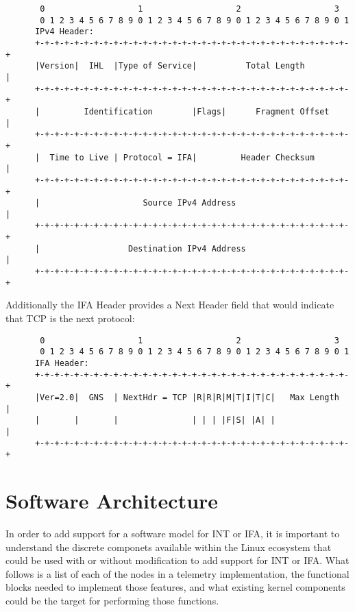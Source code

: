 \documentclass[letterpaper,twocolumn,10pt]{article}
\begin{document}
\tiny
\begin{center}
\begin{verbatim}
       0                   1                   2                   3
       0 1 2 3 4 5 6 7 8 9 0 1 2 3 4 5 6 7 8 9 0 1 2 3 4 5 6 7 8 9 0 1
      IPv4 Header:
      +-+-+-+-+-+-+-+-+-+-+-+-+-+-+-+-+-+-+-+-+-+-+-+-+-+-+-+-+-+-+-+-+
      |Version|  IHL  |Type of Service|          Total Length         |
      +-+-+-+-+-+-+-+-+-+-+-+-+-+-+-+-+-+-+-+-+-+-+-+-+-+-+-+-+-+-+-+-+
      |         Identification        |Flags|      Fragment Offset    |
      +-+-+-+-+-+-+-+-+-+-+-+-+-+-+-+-+-+-+-+-+-+-+-+-+-+-+-+-+-+-+-+-+
      |  Time to Live | Protocol = IFA|         Header Checksum       |
      +-+-+-+-+-+-+-+-+-+-+-+-+-+-+-+-+-+-+-+-+-+-+-+-+-+-+-+-+-+-+-+-+
      |                     Source IPv4 Address                       |
      +-+-+-+-+-+-+-+-+-+-+-+-+-+-+-+-+-+-+-+-+-+-+-+-+-+-+-+-+-+-+-+-+
      |                  Destination IPv4 Address                     |
      +-+-+-+-+-+-+-+-+-+-+-+-+-+-+-+-+-+-+-+-+-+-+-+-+-+-+-+-+-+-+-+-+
\end{verbatim}
\end{center}
\normalsize

Additionally the IFA Header provides a Next Header field that would
indicate that TCP is the next protocol:

\tiny
\begin{center}
\begin{verbatim}
       0                   1                   2                   3
       0 1 2 3 4 5 6 7 8 9 0 1 2 3 4 5 6 7 8 9 0 1 2 3 4 5 6 7 8 9 0 1
      IFA Header:
      +-+-+-+-+-+-+-+-+-+-+-+-+-+-+-+-+-+-+-+-+-+-+-+-+-+-+-+-+-+-+-+-+
      |Ver=2.0|  GNS  | NextHdr = TCP |R|R|R|M|T|I|T|C|   Max Length  |
      |       |       |               | | | |F|S| |A| |               |
      +-+-+-+-+-+-+-+-+-+-+-+-+-+-+-+-+-+-+-+-+-+-+-+-+-+-+-+-+-+-+-+-+
\end{verbatim}
\end{center}
\normalsize

\section{Software Architecture}

In order to add support for a software model for INT or IFA, it is
important to understand the discrete componets available within the
Linux ecosystem that could be used with or without modification to
add support for INT or IFA.  What follows is a list of each of the
nodes in a telemetry implementation, the functional blocks needed to
implement those features, and what existing kernel components could be
the target for performing those functions.
\end{document}
